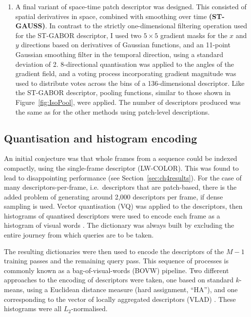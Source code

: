 \begin{enumerate}
\item A final variant of space-time patch descriptor was designed.  This consisted of spatial derivatives in space, combined with smoothing over time \textbf{(ST-GAUSS)}.  In contrast to the strictly one-dimensional filtering operation used for the ST-GABOR descriptor, I used two $5\times 5$ gradient masks for the $x$ and $y$ directions based on derivatives of Gaussian functions, and an 11-point Gaussian smoothing filter in the temporal direction, using a standard deviation of 2.  8-directional quantisation was applied to the angles of the gradient field, and a voting process incorporating gradient magnitude was used to distribute votes across the bins of a 136-dimensional descriptor.  Like the ST-GABOR descriptor, pooling functions, similar to those shown in Figure~\ref{fig:IsoPool}, were applied.  The number of descriptors produced was the same as for the other methods using patch-level descriptions.


\end{enumerate}


\subsection{Quantisation and histogram encoding}
\label{sec:quant_and_encod}
An initial conjecture was that whole frames from a sequence could be indexed compactly, using the single-frame descriptor (LW-COLOR).  This was found to lead to disappointing performance (see Section~\ref{sec:ch4results}). For the case of many descriptors-per-frame, i.e.\ descriptors that are patch-based, there is the added problem of generating around 2,000 descriptors per frame, if dense sampling is used.  Vector quantisation (VQ) was applied to the descriptors, then histograms of quantised descriptors were used to encode each frame as a histogram of visual words \citep{Csurka2004}. The dictionary was always built by excluding the entire journey from which queries are to be taken. 

The resulting dictionaries were then used to encode the descriptors of the $M-1$ training passes and the remaining query pass. This sequence of processes is commonly known as a bag-of-visual-words (BOVW) pipeline. Two different approaches to the encoding of descriptors were taken, one based on standard $k$-means, using a Euclidean distance measure (hard assignment, ``HA''), and one corresponding to the vector of locally aggregated descriptors (VLAD) \citep{Arandjelovic}. These histograms were all $L_2$-normalised.  

